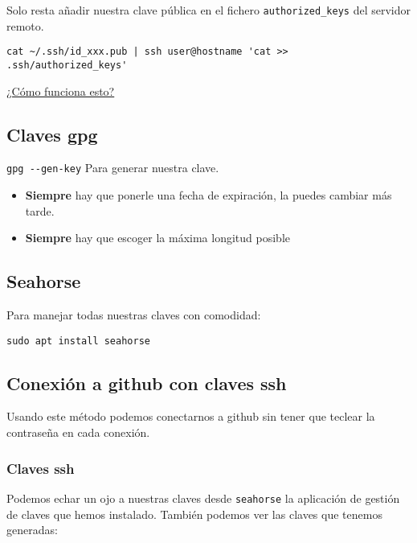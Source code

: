 \documentclass[
  12pt,
  spanish,
]{article}
\providecommand{\tightlist}{%
  \setlength{\itemsep}{0pt}\setlength{\parskip}{0pt}}
\begin{document}
Solo resta añadir nuestra clave pública en el fichero
\texttt{authorized\_keys} del servidor remoto.

\begin{verbatim}
cat ~/.ssh/id_xxx.pub | ssh user@hostname 'cat >> .ssh/authorized_keys'
\end{verbatim}

\href{https://www.digitalocean.com/community/tutorials/understanding-the-ssh-encryption-and-connection-process}{¿Cómo
funciona esto?}

\hypertarget{claves-gpg}{%
\subsection{Claves gpg}\label{claves-gpg}}

\texttt{gpg\ -\/-gen-key} Para generar nuestra clave.

\begin{itemize}
\tightlist
\item
  \textbf{Siempre} hay que ponerle una fecha de expiración, la puedes
  cambiar más tarde.
\item
  \textbf{Siempre} hay que escoger la máxima longitud posible
\end{itemize}

\hypertarget{seahorse}{%
\subsection{Seahorse}\label{seahorse}}

Para manejar todas nuestras claves con comodidad:

\texttt{sudo\ apt\ install\ seahorse}

\hypertarget{conexiuxf3n-a-github-con-claves-ssh}{%
\subsection{Conexión a github con claves
ssh}\label{conexiuxf3n-a-github-con-claves-ssh}}

Usando este método podemos conectarnos a github sin tener que teclear la
contraseña en cada conexión.

\hypertarget{claves-ssh}{%
\subsubsection{Claves ssh}\label{claves-ssh}}

Podemos echar un ojo a nuestras claves desde \texttt{seahorse} la
aplicación de gestión de claves que hemos instalado. También podemos ver
las claves que tenemos generadas:
\end{document}
